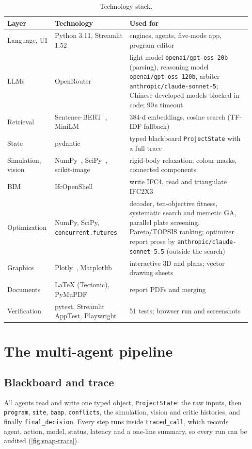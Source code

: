 \documentclass[10pt,a4paper]{article}
\newcommand{\code}[1]{\texttt{\small #1}}
\theoremstyle{definition}
\begin{document}
\begin{table}[H]
\centering\small
\caption{Technology stack.}
\label{tab:stack}
\begin{tabularx}{\linewidth}{@{}l l X@{}}
\toprule
\textbf{Layer} & \textbf{Technology} & \textbf{Used for} \\ \midrule
Language, UI & Python 3.11, Streamlit 1.52 & engines, agents, five-mode app, program editor \\
LLMs & OpenRouter~\citep{openrouter} & light model \code{openai/gpt-oss-20b} (parsing), reasoning model \code{openai/gpt-oss-120b}, arbiter \code{anthropic/claude-sonnet-5}; Chinese-developed models blocked in code; 90\,s timeout \\
Retrieval & Sentence-BERT~\citep{reimers2019sbert}, MiniLM~\citep{wang2020minilm} & 384-d embeddings, cosine search (TF-IDF fallback) \\
State & pydantic & typed blackboard \code{ProjectState} with a full trace \\
Simulation, vision & NumPy~\citep{harris2020numpy}, SciPy~\citep{virtanen2020scipy}, scikit-image~\citep{vanderwalt2014skimage} & rigid-body relaxation; colour masks, connected components \\
BIM & IfcOpenShell~\citep{ifcopenshell} & write IFC4, read and triangulate IFC2X3 \\
Optimization & NumPy, SciPy, \code{concurrent.futures} & decoder, ten-objective fitness, systematic search and memetic GA, parallel plate screening, Pareto/TOPSIS ranking; optimizer report prose by \code{anthropic/claude-sonnet-5.5} (outside the search) \\
Graphics & Plotly~\citep{plotly}, Matplotlib~\citep{hunter2007matplotlib} & interactive 3D and plans; vector drawing sheets \\
Documents & LaTeX (Tectonic), PyMuPDF & report PDFs and merging \\
Verification & pytest, Streamlit AppTest, Playwright & 51 tests; browser run and screenshots \\
\bottomrule
\end{tabularx}
\end{table}

\section{The multi-agent pipeline}
\label{sec:pipeline}

\subsection{Blackboard and trace}
All agents read and write one typed object, \code{ProjectState}: the raw inputs, then \code{program}, \code{site},
\code{baap}, \code{conflicts}, the simulation, vision and critic histories, and finally \code{final\_decision}. Every
step runs inside \code{traced\_call}, which records agent, action, model, status, latency and a one-line summary, so
every run can be audited (\cref{fig:snap-trace}).
\end{document}
